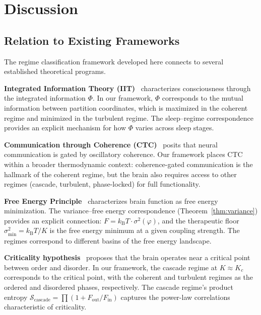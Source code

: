 \documentclass[aps,prd,twocolumn,superscriptaddress,floatfix,nofootinbib]{revtex4-2}
\theoremstyle{remark}
\newcommand{\kB}{k_{\mathrm{B}}}
\newcommand{\Kc}{K_c}
\newcommand{\Sregime}{\mathcal{S}}
\begin{document}
\section{Discussion}
\label{sec:discussion}

\subsection{Relation to Existing Frameworks}

The regime classification framework developed here connects to several established theoretical programs.

\textbf{Integrated Information Theory (IIT)}~\cite{tononi2004information,tononi2016integrated} characterizes consciousness through the integrated information $\Phi$. In our framework, $\Phi$ corresponds to the mutual information between partition coordinates, which is maximized in the coherent regime and minimized in the turbulent regime. The sleep--regime correspondence provides an explicit mechanism for how $\Phi$ varies across sleep stages.

\textbf{Communication through Coherence (CTC)}~\cite{fries2005mechanism,fries2015rhythms} posits that neural communication is gated by oscillatory coherence. Our framework places CTC within a broader thermodynamic context: coherence-gated communication is the hallmark of the coherent regime, but the brain also requires access to other regimes (cascade, turbulent, phase-locked) for full functionality.

\textbf{Free Energy Principle}~\cite{friston2010free,friston2006free} characterizes brain function as free energy minimization. The variance--free energy correspondence (Theorem~\ref{thm:variance}) provides an explicit connection: $F = \kB T \cdot \sigma^2(\varphi)$, and the therapeutic floor $\sigma^2_{\min} = \kB T / K$ is the free energy minimum at a given coupling strength. The regimes correspond to different basins of the free energy landscape.

\textbf{Criticality hypothesis}~\cite{beggs2003neuronal,chialvo2010emergent} proposes that the brain operates near a critical point between order and disorder. In our framework, the cascade regime at $K \approx \Kc$ corresponds to the critical point, with the coherent and turbulent regimes as the ordered and disordered phases, respectively. The cascade regime's product entropy $\Sregime_{\text{cascade}} = \prod(1 + F_{\text{out}}/F_{\text{in}})$ captures the power-law correlations characteristic of criticality.
\end{document}
